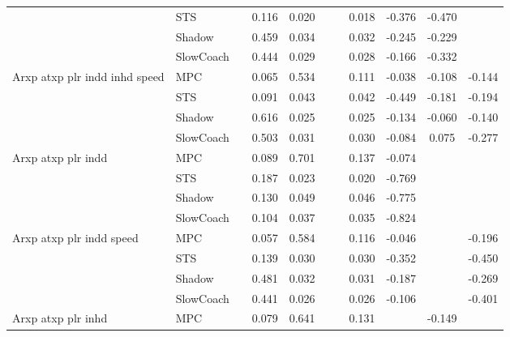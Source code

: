 \begin{tabular}{|l|l|*{9}{c|}}
                              & STS &       &     0.116 &     0.020 &     &     &  0.018 &  -0.376 &  -0.470 &       \\
                              & Shadow &       &     0.459 &     0.034 &     &     &  0.032 &  -0.245 &  -0.229 &       \\
                              & SlowCoach &       &     0.444 &     0.029 &     &     &  0.028 &  -0.166 &  -0.332 &       \\
\midrule
Arxp atxp plr indd inhd speed    & MPC &       &     0.065 &     0.534 &     &     &  0.111 &  -0.038 &  -0.108 &   -0.144 \\
                              & STS &       &     0.091 &     0.043 &     &     &  0.042 &  -0.449 &  -0.181 &   -0.194 \\
                              & Shadow &       &     0.616 &     0.025 &     &     &  0.025 &  -0.134 &  -0.060 &   -0.140 \\
                              & SlowCoach &       &     0.503 &     0.031 &     &     &  0.030 &  -0.084 &   0.075 &   -0.277 \\
\midrule
Arxp atxp plr indd    & MPC &       &     0.089 &     0.701 &     &     &  0.137 &  -0.074 &      &       \\
                              & STS &       &     0.187 &     0.023 &     &     &  0.020 &  -0.769 &      &       \\
                              & Shadow &       &     0.130 &     0.049 &     &     &  0.046 &  -0.775 &      &       \\
                              & SlowCoach &       &     0.104 &     0.037 &     &     &  0.035 &  -0.824 &      &       \\
\midrule
Arxp atxp plr indd speed    & MPC &       &     0.057 &     0.584 &     &     &  0.116 &  -0.046 &      &   -0.196 \\
                              & STS &       &     0.139 &     0.030 &     &     &  0.030 &  -0.352 &      &   -0.450 \\
                              & Shadow &       &     0.481 &     0.032 &     &     &  0.031 &  -0.187 &      &   -0.269 \\
                              & SlowCoach &       &     0.441 &     0.026 &     &     &  0.026 &  -0.106 &      &   -0.401 \\
\midrule
Arxp atxp plr inhd    & MPC &       &     0.079 &     0.641 &     &     &  0.131 &      &  -0.149 &       \\

\end{tabular}
